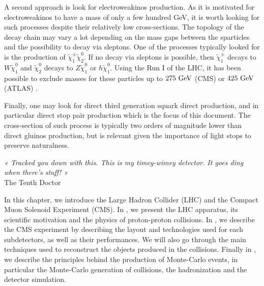         A second approach is look for electroweakinos production. As it is motivated for
        electroweakinos to have a mass of only a few hundred GeV, it is worth looking for
        such processes despite their relatively low cross-sections. The topology of the
        decay chain may vary a lot depending on the mass gaps between the sparticles and
        the possibility to decay via sleptons. One of the processes typically looked for
        is the production of $\tilde{\chi}_1^\pm \tilde{\chi}_2^0$. If no decay via sleptons
        is possible, then $\tilde{\chi}_1^\pm$ decays to $W \tilde{\chi}_1^0$ and $\tilde{\chi}_2^0$
        decays to $Z \tilde{\chi}_1^0$ or $h \tilde{\chi}_1^0$. Using the Run I of the LHC, it has been possible
        to exclude masses for these particles up to $275~\text{GeV}$ (CMS) or $425~\text{GeV}$ (ATLAS) \cite{CMSEwkino, ATLASEwkino}.

        Finally, one may look for direct third generation squark direct production,
        and in particular direct stop pair production which is the focus of this document.
        The cross-section of such process is typically two orders of magnitude lower than
        direct gluinos production, but is relevant given the importance of light stops to
        preserve naturalness.

\setcounter{mtc}{3}
\vspace*{-0.7cm}
\hspace*{0.39\textwidth}
\begin{minipage}{0.6\textwidth}
\emph{« Tracked you down with this. This is my timey-wimey detector. It goes ding when there’s stuff! »}\\
\hspace*{0.6\textwidth} The Tenth Doctor
\end{minipage}
\minitoc
\newpage

    In this chapter, we introduce the Large Hadron Collider (LHC) and the Compact Muon Solenoid
    Experiment (CMS). In , we present the LHC apparatus,
    its scientific motivation and the physics of proton-proton collisions. In ,
    we describe the CMS experiment by describing the layout and technologies used for each
    subdetectors, as well as their performances. We will also go through the main techniques
    used to reconstruct the objects produced in the collisions. Finally in ,
    we describe the principles behind the production of Monte-Carlo events, in particular
    the Monte-Carlo generation of collisions, the hadronization and the detector simulation.


